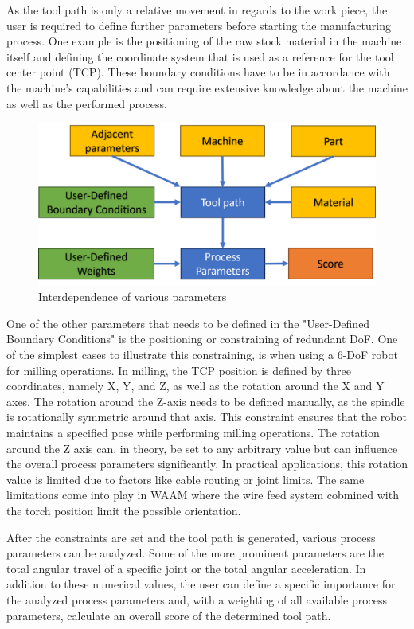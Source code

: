 As the tool path is only a relative movement in regards to the work piece, the user is required to define further parameters before starting the manufacturing process. One example is the positioning of the raw stock material in the machine itself and defining the coordinate system that is used as a reference for the tool center point (TCP). These boundary conditions have to be in accordance with the machine's capabilities and can require extensive knowledge about the machine as well as the performed process.
\begin{figure}[H]
	\centerline{\includegraphics[scale=.6]{figures/BasicScore.png}}
	\caption{Interdependence of various parameters}
	\label{BasicScore}
\end{figure}

One of the other parameters that needs to be defined in the "User-Defined Boundary Conditions" is the positioning or constraining of redundant DoF. One of the simplest cases to illustrate this constraining, is when using a 6-DoF robot for milling operations. In milling, the TCP position is defined by three coordinates, namely X, Y, and Z, as well as the rotation around the X and Y axes. The rotation around the Z-axis needs to be defined manually, as the spindle is rotationally symmetric around that axis. This constraint ensures that the robot maintains a specified pose while performing milling operations. The rotation around the Z axis can, in theory, be set to any arbitrary value but can influence the overall process parameters significantly. In practical applications, this rotation value is limited due to factors like cable routing or joint limits. The same limitations come into play in WAAM where the wire feed system cobmined with the torch position limit the possible orientation.

After the constraints are set and the tool path is generated, various process parameters can be analyzed. Some of the more prominent parameters are the total angular travel of a specific joint or the total angular acceleration. In addition to these numerical values, the user can define a specific importance for the analyzed process parameters and, with a weighting of all available process parameters, calculate an overall score of the determined tool path.

